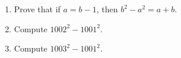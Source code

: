 \begin{enumerate}
\item[(a)] Prove that if $a=b-1$, then $b^2-a^2=a+b$.
\item[(b)] Compute $1002^2-1001^2$.
\item[(c)] Compute $1003^2-1001^2$.
\end{enumerate}
